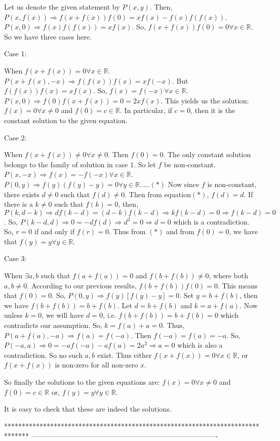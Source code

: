 \begin{solution}
	Let us denote the given statement by $P(x,y)$. Then,
$P(x,f(x))\Rightarrow f(x+f(x))f(0)=xf(x)-f(x)f(f(x))$.
$P(x,0)\Rightarrow f(x)f(f(x))=xf(x)$.
So, $f(x+f(x))f(0)=0 \forall x\in \mathbb{R}$.
So we have three cases here.

\begin{bolded}Case 1:\end{bolded} When $f(x+f(x))=0 \forall x\in \mathbb{R}$.
$P(x+f(x),-x)\Rightarrow f(f(x))f(x)=xf(-x)$. But $f(f(x))f(x)=xf(x)$. So, $f(x)=f(-x)\forall x\in \mathbb{R}$.
$P(x,0)\Rightarrow f(0)f(x+f(x))=0=2xf(x)$. This yields us the solution:
$f(x)=0\forall x\neq 0$ and $f(0)=c\in \mathbb{R}$. In particular, if $c=0$, then it is the constant solution to the given equation.

\begin{bolded}Case 2:\end{bolded} When $f(x+f(x))\neq 0\forall x\neq 0$.
Then $f(0)=0$. The only constant solution belongs to the family of solution in case $1$. So let $f$ be non-constant.
$P(x,-x)\Rightarrow f(x)=-f(-x)\forall x\in \mathbb{R}$.
$P(0,y)\Rightarrow f(y)(f(y)-y)=0 \forall y\in \mathbb{R}.....(*)$
Now since $f$ is non-constant, there exists $d\neq 0$ such that $f(d)\neq 0$. Then from equation$(*)$, $f(d)=d$.
If there is a $k\neq 0$ such that $f(k)=0$, then,
$P(k,d-k)\Rightarrow df(k-d)=(d-k)f(k-d)\Rightarrow kf(k-d)=0\Rightarrow f(k-d)=0$. So,
$P(k-d,d)\Rightarrow 0=-df(d)\Rightarrow d^{2}=0\Rightarrow d=0$ which is a contradiction.
So, $r=0$ if and only if $f(r)=0$. Thus from $(*)$ and from $f(0)=0$, we have that $f(y)=y\forall y\in \mathbb{R}$.

\begin{bolded}Case 3:\end{bolded}  When $\exists a,b$ such that $f(a+f(a))=0$ and $f(b+f(b))\neq 0$, where both $a,b\neq 0$.
According to our previous results, $f(b+f(b))f(0)=0$. This means that $f(0)=0$. So,
$P(0,y)\Rightarrow f(y)[f(y)-y]=0$. Set $y=b+f(b)$, then we have $f(b+f(b))=b+f(b)$.
Let $d=b+f(b)$ and $k=a+f(a)$. Now unless $k=0$, we will have $d=0$, i.e. $f(b+f(b))=b+f(b)=0$ which contradicts our assumption. So, $k=f(a)+a=0$. Thus,
$P(a+f(a),-a)\Rightarrow f(a)=f(-a)$. Then $f(-a)=f(a)=-a$. So, 
$P(-a,a)\Rightarrow 0=-af(-a)-af(a)=2a^{2}\Rightarrow a=0$ which is also a contradiction. So no such $a,b$ exist.
Thus either $f(x+f(x))=0\forall x\in \mathbb{R}$, or $f(x+f(x))$ is non-zero for all non-zero $x$.

So finally the solutions to the given equations are:
$f(x)=0\forall x\neq 0$ and $f(0)=c\in \mathbb{R}$
or,
$f(y)=y\forall y\in \mathbb{R}$.

It is easy to check that these are indeed the solutions.
\end{solution}
*******************************************************************************
-------------------------------------------------------------------------------

